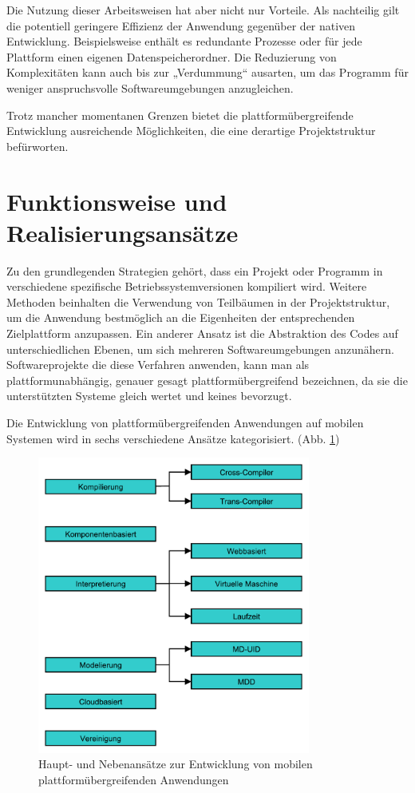 Die Nutzung dieser Arbeitsweisen hat aber nicht nur Vorteile. Als nachteilig gilt die potentiell geringere Effizienz der Anwendung gegenüber der nativen Entwicklung. Beispielsweise enthält es redundante Prozesse oder für jede Plattform einen eigenen Datenspeicherordner. Die Reduzierung von Komplexitäten kann auch bis zur „Verdummung“ ausarten, um das Programm für weniger anspruchsvolle Softwareumgebungen anzugleichen. 

Trotz mancher momentanen Grenzen bietet die plattformübergreifende Entwicklung ausreichende Möglichkeiten, die eine derartige Projektstruktur befürworten.\citep{cross_plattform_explanation}

\section{Funktionsweise und Realisierungsansätze}
Zu den grundlegenden Strategien gehört, dass ein Projekt oder Programm in verschiedene spezifische Betriebssystemversionen kompiliert wird. Weitere Methoden beinhalten die Verwendung von Teilbäumen in der Projektstruktur, um die Anwendung bestmöglich an die Eigenheiten der entsprechenden Zielplattform anzupassen. Ein anderer Ansatz ist die Abstraktion des Codes auf unterschiedlichen Ebenen, um sich mehreren Softwareumgebungen anzunähern. Softwareprojekte die diese Verfahren anwenden, kann man als plattformunabhängig, genauer gesagt plattformübergreifend bezeichnen, da sie die unterstützten Systeme gleich wertet und keines bevorzugt.\citep{cross_plattform_explanation}

\bigskip
Die Entwicklung von plattformübergreifenden Anwendungen auf mobilen Systemen wird in sechs verschiedene Ansätze kategorisiert. (Abb. \ref{graph_cross_plattform_approaches})

\begin{figure}[htbp]
	\centering
	\includegraphics[width=0.8\textwidth]{Bilder/Cross_Plattform_Ansaetze}
	\caption{Haupt- und Nebenansätze zur Entwicklung von mobilen plattformübergreifenden Anwendungen}\label{graph_cross_plattform_approaches}
\end{figure}

